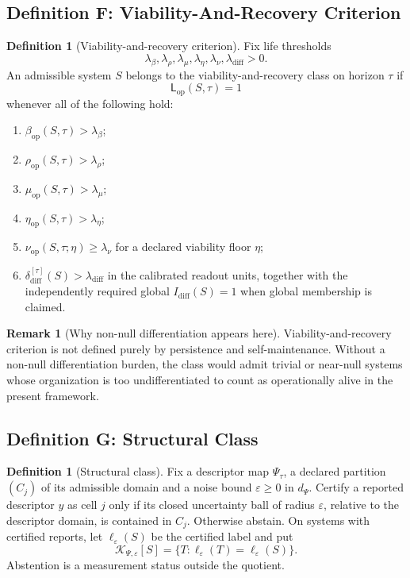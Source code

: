 \documentclass[11pt,a4paper]{article}
\theoremstyle{definition}
\newtheorem{definition}[proposition]{Definition}
\newtheorem{remark}[proposition]{Remark}
\newcommand{\Lop}{\mathsf{L}_{\mathrm{op}}}
\newcommand{\LifeStructClass}{\mathscr{K}}
\newcommand{\PsiVec}{\Psi}
\newcommand{\eps}{\varepsilon}
\newcommand{\Idiff}{I_{\mathrm{diff}}}
\newcommand{\Bound}{\beta_{\mathrm{op}}}
\newcommand{\Persist}{\rho_{\mathrm{op}}}
\newcommand{\Maint}{\mu_{\mathrm{op}}}
\newcommand{\HistDep}{\eta_{\mathrm{op}}}
\newcommand{\Viab}{\nu_{\mathrm{op}}}
\begin{document}
\subsection{Definition F: Viability-And-Recovery Criterion}
\begin{definition}[Viability-and-recovery criterion]\label{def:operational-life}
Fix life thresholds
\[
\lambda_{\beta},\lambda_{\rho},\lambda_{\mu},\lambda_{\eta},\lambda_{\nu},\lambda_{\mathrm{diff}}>0.
\]
An admissible system $S$ belongs to the viability-and-recovery class on horizon $\tau$ if
\[
\Lop(S,\tau)=1
\]
whenever all of the following hold:
\begin{enumerate}[leftmargin=1.5em]
\item $\Bound(S,\tau) > \lambda_{\beta}$;
\item $\Persist(S,\tau) > \lambda_{\rho}$;
\item $\Maint(S,\tau) > \lambda_{\mu}$;
\item $\HistDep(S,\tau) > \lambda_{\eta}$;
\item $\Viab(S,\tau;\eta) \ge \lambda_{\nu}$ for a declared viability floor $\eta$;
\item $\delta_{\mathrm{diff}}^{[\tau]}(S) > \lambda_{\mathrm{diff}}$ in the calibrated readout units, together with the independently required global $\Idiff(S)=1$ when global membership is claimed.
\end{enumerate}
\end{definition}

\begin{remark}[Why non-null differentiation appears here]
Viability-and-recovery criterion is not defined purely by persistence and self-maintenance. Without a non-null differentiation burden, the class would admit trivial or near-null systems whose organization is too undifferentiated to count as operationally alive in the present framework.
\end{remark}

\subsection{Definition G: Structural Class}
\begin{definition}[Structural class]\label{def:structural-class}
Fix a descriptor map $\PsiVec_\tau$, a declared partition $(C_j)$ of its admissible domain and a noise bound $\eps\ge0$ in $d_\Psi$. Certify a reported descriptor $y$ as cell $j$ only if its closed uncertainty ball of radius $\eps$, relative to the descriptor domain, is contained in $C_j$. Otherwise abstain. On systems with certified reports, let $\ell_\eps(S)$ be the certified label and put
\[
 \LifeStructClass_{\PsiVec,\eps}[S]=\{T:\ell_\eps(T)=\ell_\eps(S)\}.
\]
Abstention is a measurement status outside the quotient.
\end{definition}
\end{document}
